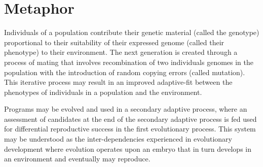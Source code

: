 \documentclass[a4paper, 11pt]{article}
\begin{document}
\section{Metaphor}
\label{sec:metaphor}
Individuals of a population contribute their genetic material (called the genotype) proportional to their suitability of their expressed genome (called their phenotype) to their environment. The next generation is created through a process of mating that involves recombination of two individuals genomes in the population with the introduction of random copying errors (called mutation). This iterative process may result in an improved adaptive-fit between the phenotypes of individuals in a population and the environment.

Programs may be evolved and used in a secondary adaptive process, where an assessment of candidates at the end of the secondary adaptive process is fed used for differential reproductive success in the first evolutionary process. This system may be understood as the inter-dependencies experienced in evolutionary development where evolution operates upon an embryo that in turn develops in an environment and eventually may reproduce.

\end{document}
